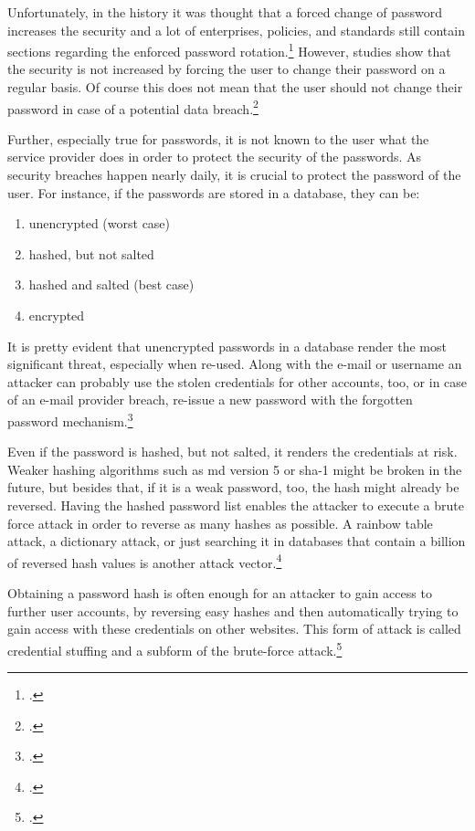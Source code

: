 Unfortunately, in the history it was thought that a forced change of password increases the security and a lot of enterprises, policies, and standards still contain sections regarding the enforced password rotation.\footcites[See][1520]{deutschlandgrundschutz} However, studies show that the security is not increased by forcing the user to change their password on a regular basis. Of course this does not mean that the user should not change their password in case of a potential data breach.\footcites[See][14]{SP80063B}[See][]{7676198}[See][34]{anderson2008security}

Further, especially true for passwords, it is not known to the user what the service provider does in order to protect the security of the passwords. As security breaches happen nearly daily, it is crucial to protect the password of the user. For instance, if the passwords are stored in a database, they can be:

\begin{enumerate}[label=(\alph*)]
	\item unencrypted (worst case)
	\item hashed, but not salted
	\item hashed and salted (best case)
	\item encrypted
\end{enumerate}

It is pretty evident that unencrypted passwords in a database render the most significant threat, especially when re-used. Along with the e-mail or username an attacker can probably use the stolen credentials for other accounts, too, or in case of an e-mail provider breach, re-issue a new password with the \frqq forgotten password\flqq{} mechanism.\footcite[See][277]{shostack2014threat}

Even if the password is hashed, but not salted, it renders the credentials at risk. Weaker hashing algorithms such as \gls{md} version 5 or \gls{sha}-1 might be broken in the future, but besides that, if it is a weak password, too, the hash might already be reversed. Having the hashed password list enables the attacker to execute a brute force attack in order to reverse as many hashes as possible. A rainbow table attack, a dictionary attack, or just searching it in databases that contain a billion of reversed hash values is another attack vector.\footcites[See][1425]{Thomas:2017:DBP:3133956.3134067}[See][427--430]{320284}[See][56--57]{anderson2008security}

Obtaining a password hash is often enough for an attacker to gain access to further user accounts, by reversing easy hashes and then automatically trying to gain access with these credentials on other websites. This form of attack is called \frqq credential stuffing\flqq{} and a subform of the brute-force attack.\footcites[See][]{troy-hunt-1}[See][1565]{48399}[See][Chapter 5.5]{zabicki2019practical}

